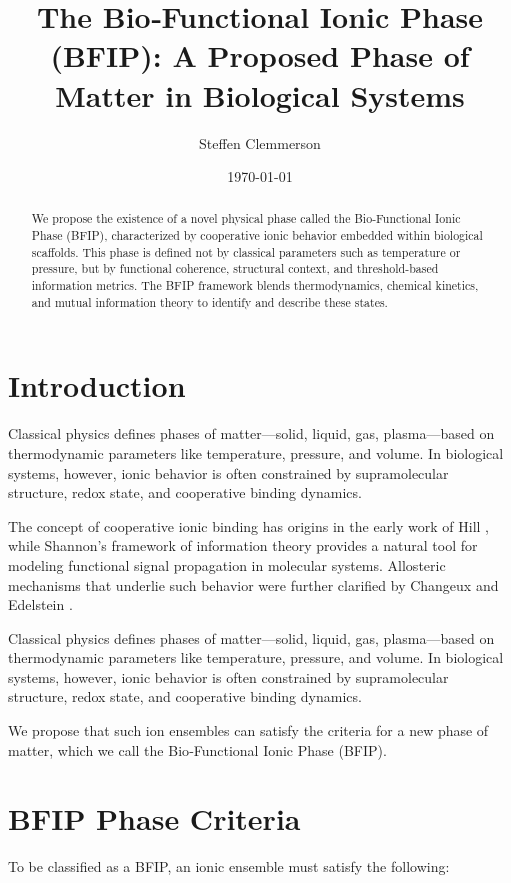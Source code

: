 \documentclass[11pt]{article}
\title{\textbf{The Bio‑Functional Ionic Phase (BFIP): A Proposed Phase of Matter in Biological Systems}}
\author[1]{Steffen Clemmerson}
\affil[1]{Ion Phase Lab, TARDiS Physical Sciences Project}
\date{\today}
\begin{document}
\maketitle

\begin{abstract}
We propose the existence of a novel physical phase called the Bio‑Functional Ionic Phase (BFIP), characterized by cooperative ionic behavior embedded within biological scaffolds. This phase is defined not by classical parameters such as temperature or pressure, but by functional coherence, structural context, and threshold-based information metrics. The BFIP framework blends thermodynamics, chemical kinetics, and mutual information theory to identify and describe these states.
\end{abstract}

\section{Introduction}
Classical physics defines phases of matter—solid, liquid, gas, plasma—based on thermodynamic parameters like temperature, pressure, and volume. In biological systems, however, ionic behavior is often constrained by supramolecular structure, redox state, and cooperative binding dynamics.

The concept of cooperative ionic binding has origins in the early work of Hill \cite{hill1910}, while Shannon's framework of information theory \cite{shannon1948} provides a natural tool for modeling functional signal propagation in molecular systems. Allosteric mechanisms that underlie such behavior were further clarified by Changeux and Edelstein \cite{changeux1984}.


Classical physics defines phases of matter—solid, liquid, gas, plasma—based on thermodynamic parameters like temperature, pressure, and volume. In biological systems, however, ionic behavior is often constrained by supramolecular structure, redox state, and cooperative binding dynamics.

We propose that such ion ensembles can satisfy the criteria for a new phase of matter, which we call the Bio‑Functional Ionic Phase (BFIP).

\section{BFIP Phase Criteria}

To be classified as a BFIP, an ionic ensemble must satisfy the following:
\end{document}

